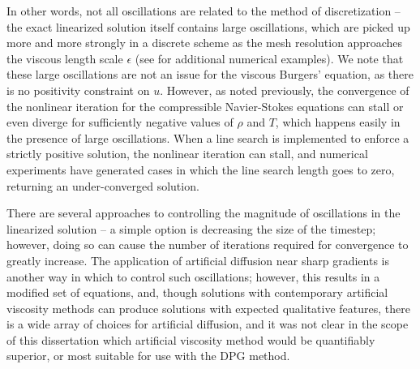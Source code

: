 In other words, not all oscillations are related to the method of discretization -- the exact linearized solution itself contains large oscillations, which are picked up more and more strongly in a discrete scheme as the mesh resolution approaches the viscous length scale $\epsilon$ (see \cite{DPGspacetime, DPGNS_1d} for additional numerical examples).  We note that these large oscillations are not an issue for the viscous Burgers' equation, as there is no positivity constraint on $u$.  However, as noted previously, the convergence of the nonlinear iteration for the compressible Navier-Stokes equations can stall or even diverge for sufficiently negative values of $\rho$ and $T$, which happens easily in the presence of large oscillations.  When a line search is implemented to enforce a strictly positive solution, the nonlinear iteration can stall, and numerical experiments have generated cases in which the line search length goes to zero, returning an under-converged solution.  

There are several approaches to controlling the magnitude of oscillations in the linearized solution -- a simple option is decreasing the size of the timestep; however, doing so can cause the number of iterations required for convergence to greatly increase.  The application of artificial diffusion near sharp gradients is another way in which to control such oscillations; however, this results in a modified set of equations, and, though solutions with contemporary artificial viscosity methods can produce solutions with expected qualitative features, there is a wide array of choices for artificial diffusion, and it was not clear in the scope of this dissertation which artificial viscosity method would be quantifiably superior, or most suitable for use with the DPG method.  

